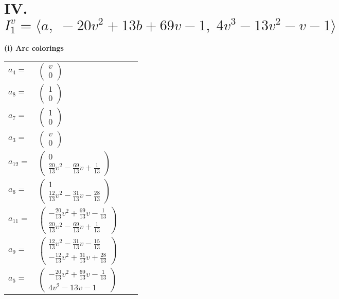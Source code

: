 \documentclass[1p]{elsarticle_modified}
\theoremstyle{definition}
\begin{document}
\centering \section*{IV. $I^v_{1}= \langle a,\;-20 v^2+13 b+69 v-1,\;4 v^3-13 v^2- v-1 \rangle$}
\flushleft \textbf{(i) Arc colorings}\\
\begin{tabular}{m{7pt} m{180pt} m{7pt} m{180pt} }
\flushright $a_{4}=$&$\begin{pmatrix}v\\0\end{pmatrix}$ \\
\flushright $a_{8}=$&$\begin{pmatrix}1\\0\end{pmatrix}$ \\
\flushright $a_{7}=$&$\begin{pmatrix}1\\0\end{pmatrix}$ \\
\flushright $a_{3}=$&$\begin{pmatrix}v\\0\end{pmatrix}$ \\
\flushright $a_{12}=$&$\begin{pmatrix}0\\\frac{20}{13} v^2-\frac{69}{13} v+\frac{1}{13}\end{pmatrix}$ \\
\flushright $a_{6}=$&$\begin{pmatrix}1\\\frac{12}{13} v^2-\frac{31}{13} v-\frac{28}{13}\end{pmatrix}$ \\
\flushright $a_{11}=$&$\begin{pmatrix}-\frac{20}{13} v^2+\frac{69}{13} v-\frac{1}{13}\\\frac{20}{13} v^2-\frac{69}{13} v+\frac{1}{13}\end{pmatrix}$ \\
\flushright $a_{9}=$&$\begin{pmatrix}\frac{12}{13} v^2-\frac{31}{13} v-\frac{15}{13}\\-\frac{12}{13} v^2+\frac{31}{13} v+\frac{28}{13}\end{pmatrix}$ \\
\flushright $a_{5}=$&$\begin{pmatrix}-\frac{20}{13} v^2+\frac{69}{13} v-\frac{1}{13}\\4 v^2-13 v-1\end{pmatrix}$ \\

\end{tabular}
\end{document}
